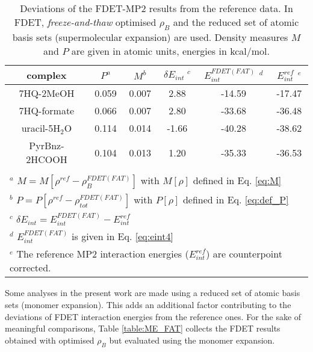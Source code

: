 \documentclass[journal=jctcce,manuscript=article]{achemso}
\begin{document}
\begin{table*}
{
\begin{center}
\begin{tabular}{|c|c|c|c|c|c|}
\hline
 complex & $P^a$ & $M^b$ & $\delta E_{int}\;^c$&$E^{FDET(FAT)}_{int}$ $^d$&$E_{int}^{ref}$ $^e$ \\ \hline
7HQ-2MeOH &0.059& 0.007 & 2.88 &-14.59 & -17.47 \\ \hline
7HQ-formate &0.066& 0.007 &  2.80&-33.68 & -36.48 \\ \hline
uracil-5H$_2$O &0.114&  0.014 & -1.66&-40.28 & -38.62 \\ \hline
PyrBnz-2HCOOH  &0.104& 0.013 & 1.20&-35.33 &  -36.53 \\ \hline
\multicolumn{6}{c}{ } \\
\multicolumn{6}{l}{$^a$ $M=M[\rho^{ref} - \rho^{FDET(FAT)}_{B}]$ with $M[\rho]$ defined in Eq. \ref{eq:M}}\\
\multicolumn{6}{l}{$^b$ $P=P[\rho^{ref} - \rho_{tot}^{FDET(FAT)}]$ with $P[\rho]$ defined in Eq. \ref{eq:def_P}}\\
\multicolumn{6}{l}{$^c$ $\delta E_{int}=E^{FDET(FAT)}_{int}-E_{int}^{ref}$} \\
\multicolumn{6}{l}{$^d$ $E^{FDET(FAT)}_{int}$ is given in Eq. \ref{eq:eint4}}\\
\multicolumn{6}{l}{$^e$ The reference MP2 interaction energies ($E_{int}^{ref}$) are counterpoint corrected.}
\end{tabular}
\end{center}
}%
\caption{Deviations of the FDET-MP2 results from the reference data.  In FDET, \textit{freeze-and-thaw} optimised $\rho_B$ and the reduced set of atomic basis sets (supermolecular expansion) are used. 
Density measures $M$ and $P$ are given in atomic units, energies in kcal/mol.
}
\label{table:SE_FAT}
\end{table*}

Some analyses in the present work are made using a reduced set of atomic basis sets (monomer expansion). This adds an additional factor contributing to the deviations of FDET interaction energies from the reference ones.  
For the sake of meaningful comparisons, Table \ref{table:ME_FAT} collects the FDET results obtained with optimised $\rho_B$ but evaluated using the monomer expansion.
\end{document}
